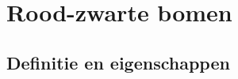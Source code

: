 \section{Rood-zwarte bomen}
\label{sec:rood-zwarte bomen}
\subsection{Definitie en eigenschappen}


